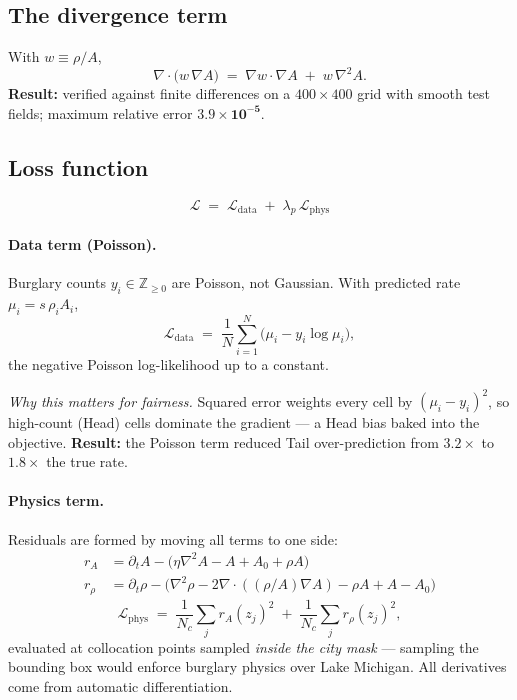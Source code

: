 \documentclass[11pt,a4paper]{article}
\begin{document}
\subsection{The divergence term}
With $w \equiv \rho/A$,
\begin{equation}
\nabla\!\cdot\!\big(w\,\nabla A\big) \;=\; \nabla w \cdot \nabla A \;+\; w\,\nabla^2 A .
\label{eq:divexp}
\end{equation}
\noindent \textbf{Result:} verified against finite differences on a
$400\times400$ grid with smooth test fields; maximum relative error
$\mathbf{3.9\times10^{-5}}$.

\subsection{Loss function}
\begin{equation}
\mathcal{L} \;=\; \mathcal{L}_{\mathrm{data}} \;+\; \lambda_p\,\mathcal{L}_{\mathrm{phys}}
\end{equation}

\paragraph{Data term (Poisson).} Burglary counts $y_i \in \mathbb{Z}_{\geq0}$
are Poisson, not Gaussian. With predicted rate $\mu_i = s\,\rho_i A_i$,
\begin{equation}
\mathcal{L}_{\mathrm{data}} \;=\; \frac{1}{N}\sum_{i=1}^{N}\Big(\mu_i - y_i\log\mu_i\Big),
\label{eq:poisson}
\end{equation}
the negative Poisson log-likelihood up to a constant.

\medskip
\noindent\emph{Why this matters for fairness.} Squared error weights every cell
by $(\mu_i - y_i)^2$, so high-count (Head) cells dominate the gradient --- a
Head bias baked into the objective. \textbf{Result:} the Poisson term reduced
Tail over-prediction from $3.2\times$ to $\mathbf{1.8\times}$ the true rate.

\paragraph{Physics term.} Residuals are formed by moving all terms to one side:
\begin{align}
r_A &= \partial_t A - \big(\eta\nabla^2 A - A + A_0 + \rho A\big) \\
r_\rho &= \partial_t \rho - \big(\nabla^2\rho - 2\nabla\!\cdot\!((\rho/A)\nabla A) - \rho A + A - A_0\big)
\end{align}
\begin{equation}
\mathcal{L}_{\mathrm{phys}} \;=\; \frac{1}{N_c}\sum_{j} r_A(z_j)^2 \;+\; \frac{1}{N_c}\sum_{j} r_\rho(z_j)^2 ,
\end{equation}
evaluated at collocation points sampled \emph{inside the city mask} ---
sampling the bounding box would enforce burglary physics over Lake Michigan.
All derivatives come from automatic differentiation.
\end{document}

